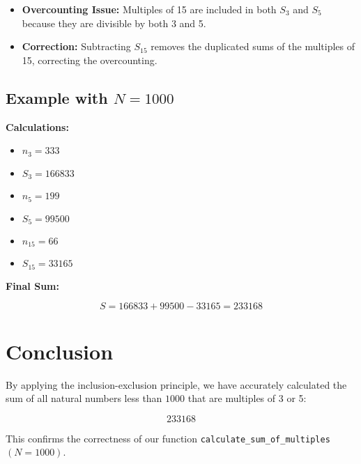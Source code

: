 \documentclass{article}
\begin{document}
\begin{itemize}
    \item \textbf{Overcounting Issue:} Multiples of 15 are included in both \( S_3 \) and \( S_5 \) because they are divisible by both 3 and 5.
    \item \textbf{Correction:} Subtracting \( S_{15} \) removes the duplicated sums of the multiples of 15, correcting the overcounting.
\end{itemize}

\subsection*{Example with \( N = 1000 \)}

\textbf{Calculations:}

\begin{itemize}
    \item \( n_3 = 333 \)
    \item \( S_3 = 166833 \)
    \item \( n_5 = 199 \)
    \item \( S_5 = 99500 \)
    \item \( n_{15} = 66 \)
    \item \( S_{15} = 33165 \)
\end{itemize}

\textbf{Final Sum:}

\[
S = 166833 + 99500 - 33165 = 233168
\]

\section*{Conclusion}

By applying the inclusion-exclusion principle, we have accurately calculated the sum of all natural numbers less than \( 1000 \) that are multiples of 3 or 5:

\[
\boxed{233168}
\]

This confirms the correctness of our function \texttt{calculate\_sum\_of\_multiples} \( (N = 1000) \).
\end{document}
